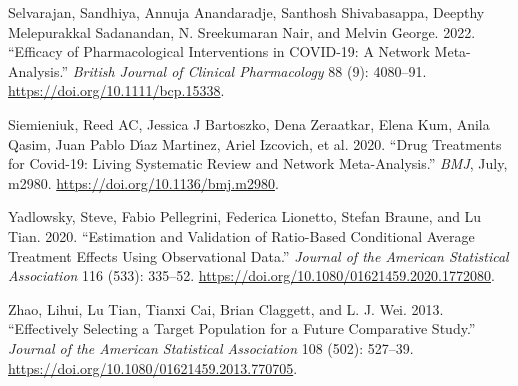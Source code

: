 \documentclass[
  letterpaper,
  DIV=11,
  numbers=noendperiod]{scrreprt}
\newlength{\cslhangindent}
\newlength{\cslentryspacingunit} %
\newenvironment{CSLReferences}[2] %
 {%
  \setlength{\parindent}{0pt}
  \ifodd #1
  \let\oldpar\par
  \def\par{\hangindent=\cslhangindent\oldpar}
  \fi
  \setlength{\parskip}{#2\cslentryspacingunit}
 }%
 {}
\begin{document}
\begin{CSLReferences}{1}{0}
\leavevmode{}%
Selvarajan, Sandhiya, Annuja Anandaradje, Santhosh Shivabasappa, Deepthy
Melepurakkal Sadanandan, N. Sreekumaran Nair, and Melvin George. 2022.
{``Efficacy of Pharmacological Interventions in {COVID}-19: A Network
Meta-Analysis.''} \emph{British Journal of Clinical Pharmacology} 88
(9): 4080--91. \url{https://doi.org/10.1111/bcp.15338}.

\leavevmode{}%
Siemieniuk, Reed AC, Jessica J Bartoszko, Dena Zeraatkar, Elena Kum,
Anila Qasim, Juan Pablo Dı́az Martinez, Ariel Izcovich, et al. 2020.
{``Drug Treatments for Covid-19: Living Systematic Review and Network
Meta-Analysis.''} \emph{{BMJ}}, July, m2980.
\url{https://doi.org/10.1136/bmj.m2980}.

\leavevmode{}%
Yadlowsky, Steve, Fabio Pellegrini, Federica Lionetto, Stefan Braune,
and Lu Tian. 2020. {``Estimation and Validation of Ratio-Based
Conditional Average Treatment Effects Using Observational Data.''}
\emph{Journal of the American Statistical Association} 116 (533):
335--52. \url{https://doi.org/10.1080/01621459.2020.1772080}.

\leavevmode{}%
Zhao, Lihui, Lu Tian, Tianxi Cai, Brian Claggett, and L. J. Wei. 2013.
{``Effectively Selecting a Target Population for a Future Comparative
Study.''} \emph{Journal of the American Statistical Association} 108
(502): 527--39. \url{https://doi.org/10.1080/01621459.2013.770705}.

\end{CSLReferences}
\end{document}
